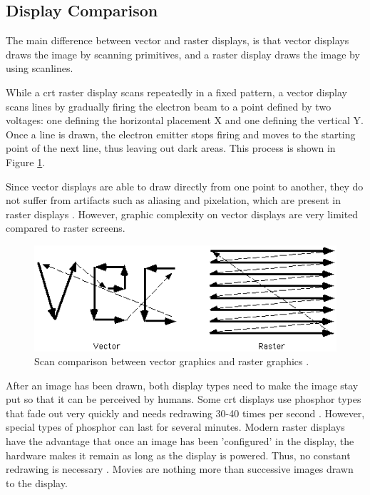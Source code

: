 \subsection{Display Comparison}
The main difference between vector and raster displays, is that vector displays draws the image by scanning primitives, and a raster display draws the image by using scanlines.

While a \gls{crt} raster display scans repeatedly in a fixed pattern, a vector display scans lines by gradually firing the electron beam to a point defined by two voltages: one defining the horizontal placement X and one defining the vertical Y.
Once a line is drawn, the electron emitter stops firing and moves to the starting point of the next line, thus leaving out dark areas.
This process is shown in Figure \ref{fig:vectorscan}.

Since vector displays are able to draw directly from one point to another, they do not suffer from artifacts such as aliasing and pixelation, which are present in raster displays \cite{vector-monitor}.
However, graphic complexity on vector displays are very limited compared to raster screens.

\begin{figure}[h!]
\centering \includegraphics[width=0.8\linewidth]{images/scan.png}
\caption{Scan comparison between vector graphics and raster graphics \cite{vecvsras}.}
\label{fig:vectorscan}
\end{figure}

After an image has been drawn, both display types need to make the image stay put so that it can be perceived by humans.
Some \gls{crt} displays use phosphor types that fade out very quickly and needs redrawing 30-40 times per second \cite{vector-monitor}.
However, special types of phosphor can last for several minutes.
Modern raster displays have the advantage that once an image has been 'configured' in the display, the hardware makes it remain as long as the display is powered.
Thus, no constant redrawing is necessary \cite{LCD-persistence}.
Movies are nothing more than successive images drawn to the display.

